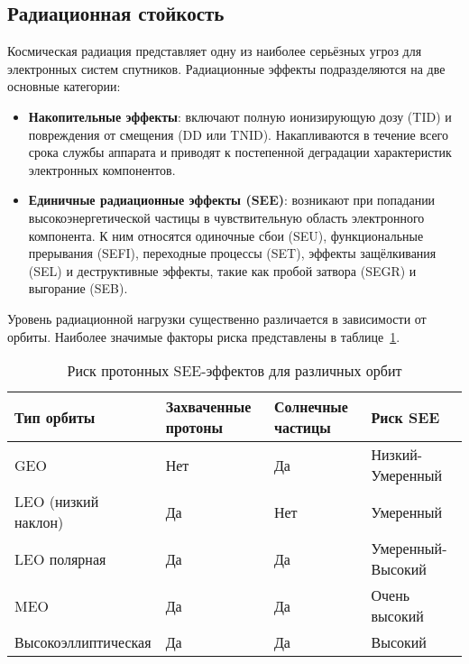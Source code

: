 \subsection{Радиационная стойкость}

Космическая радиация представляет одну из наиболее серьёзных угроз для электронных систем спутников. Радиационные эффекты подразделяются на две основные категории:

\begin{itemize}
    \item \textbf{Накопительные эффекты}: включают полную ионизирующую дозу (TID) и повреждения от смещения (DD или TNID). Накапливаются в течение всего срока службы аппарата и приводят к постепенной деградации характеристик электронных компонентов\cite{esa_radiation_standard}.
    
    \item \textbf{Единичные радиационные эффекты (SEE)}: возникают при попадании высокоэнергетической частицы в чувствительную область электронного компонента. К ним относятся одиночные сбои (SEU), функциональные прерывания (SEFI), переходные процессы (SET), эффекты защёлкивания (SEL) и деструктивные эффекты, такие как пробой затвора (SEGR) и выгорание (SEB)\cite{escc_see_test}.
\end{itemize}

Уровень радиационной нагрузки существенно различается в зависимости от орбиты. Наиболее значимые факторы риска представлены в таблице~\ref{tab:radiation_risk_orbits}.

\begin{table}[htbp]
\centering
\small
\renewcommand{\arraystretch}{1.5}
\begin{tabular}{|p{4.5cm}|p{3cm}|p{3.5cm}|p{4cm}|}
\hline
\textbf{Тип орбиты} & \textbf{Захваченные протоны} & \textbf{Солнечные частицы} & \textbf{Риск SEE} \\
\hline
GEO & Нет & Да & Низкий-Умеренный \\
\hline
LEO (низкий наклон) & Да & Нет & Умеренный \\
\hline
LEO полярная & Да & Да & Умеренный-Высокий \\
\hline
MEO & Да & Да & Очень высокий \\
\hline
Высокоэллиптическая & Да & Да & Высокий \\
\hline
\end{tabular}
\caption{Риск протонных SEE-эффектов для различных орбит}
\label{tab:radiation_risk_orbits}
\end{table}



